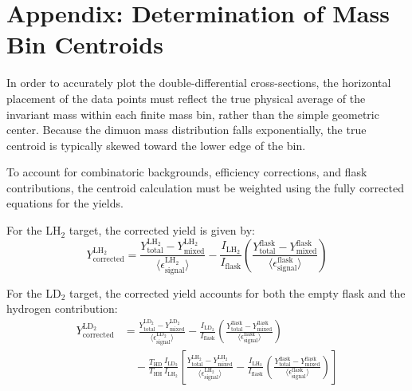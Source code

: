 
\section{Appendix: Determination of Mass Bin Centroids}
\label{sec:appendix_mass_centroids}

In order to accurately plot the double-differential cross-sections, the horizontal placement of the data points must reflect the true physical average of the invariant mass within each finite mass bin, rather than the simple geometric center. Because the dimuon mass distribution falls exponentially, the true centroid is typically skewed toward the lower edge of the bin.

To account for combinatoric backgrounds, efficiency corrections, and flask contributions, the centroid calculation must be weighted using the fully corrected equations for the yields. 

For the LH$_2$ target, the corrected yield is given by:
\begin{equation}
    \label{eq:appendix_yield_lh2}
    Y_{\text{corrected}}^{\text{LH}_2} = \frac{Y^{\text{LH}_2}_{\text{total}} - Y^{\text{LH}_2}_{\text{mixed}}}{\langle\epsilon^{\text{LH}_2}_{\text{signal}}\rangle} 
        - \frac{I_{\text{LH}_2}}{I_{\text{flask}}} 
        \left( \frac{Y^{\text{flask}}_{\text{total}} - Y^{\text{flask}}_{\text{mixed}}}{\langle\epsilon^{\text{flask}}_{\text{signal}}\rangle} \right)
\end{equation}

For the LD$_2$ target, the corrected yield accounts for both the empty flask and the hydrogen contribution:
\begin{align}
    \label{eq:appendix_yield_ld2}
    Y_{\text{corrected}}^{\text{LD}_2} &= 
        \frac{Y^{\text{LD}_2}_{\text{total}} - Y^{\text{LD}_2}_{\text{mixed}}}{\langle\epsilon^{\text{LD}_2}_{\text{signal}}\rangle} 
        - \frac{I_{\text{LD}_2}}{I_{\text{flask}}} 
        \left( \frac{Y^{\text{flask}}_{\text{total}} - Y^{\text{flask}}_{\text{mixed}}}{\langle\epsilon^{\text{flask}}_{\text{signal}}\rangle} \right) \nonumber \\
    &\quad - \frac{T_{\text{HD}}}{T_{\text{HH}}} \frac{I_{\text{LD}_2}}{I_{\text{LH}_2}}\left[ 
        \frac{Y^{\text{LH}_2}_{\text{total}} - Y^{\text{LH}_2}_{\text{mixed}}}{\langle\epsilon^{\text{LH}_2}_{\text{signal}}\rangle} 
        - \frac{I_{\text{LH}_2}}{I_{\text{flask}}} 
        \left( \frac{Y^{\text{flask}}_{\text{total}} - Y^{\text{flask}}_{\text{mixed}}}{\langle\epsilon^{\text{flask}}_{\text{signal}}\rangle} \right)
    \right]
\end{align}

